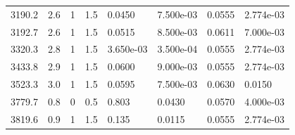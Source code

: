 \documentclass[preview]{standalone}
\begin{document}
{{\begin{tabular}{L{1.2cm}C{1.2cm} C{0.3cm}C{0.5cm} C{1.4cm}C{1.4cm} C{1.4cm}C{1.4cm}}
  3190.2  &   2.6  & 1     & 1.5 &  0.0450  & 7.500e-03  & 0.0555 &  2.774e-03   \\ 
  3192.7  &   2.6  & 1     & 1.5 &  0.0515  & 8.500e-03  & 0.0611 &  7.000e-03   \\ 
  3320.3  &   2.8  & 1     & 1.5 &  3.650e-03  & 3.500e-04  & 0.0555 &  2.774e-03   \\ 
  3433.8  &   2.9  & 1     & 1.5 &  0.0600  & 9.000e-03  & 0.0555 &  2.774e-03   \\ 
  3523.3  &   3.0  & 1     & 1.5 &  0.0595  & 7.500e-03  & 0.0630 &  0.0150   \\ 
  3779.7  &   0.8  & 0     & 0.5 &  0.803  & 0.0430  & 0.0570 &  4.000e-03   \\ 
  3819.6  &   0.9  & 1     & 1.5 &  0.135  & 0.0115  & 0.0555 &  2.774e-03   \\ 
\hline 
\end{tabular} 

}}
\end{document}
